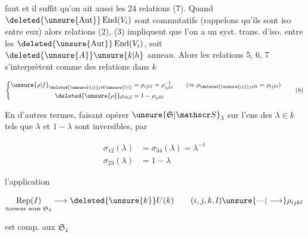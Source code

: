 
faut et il suffit qu'on ait aussi les 24 relations (7). Quand  $\deleted{\unsure{\operatorname{Aut}}}\operatorname{End}(V_i)$ sont commutatifs (rappelons qu'ils sont iso entre eux) alors    relations (2), (3) impliquent que l'on a un syst. trans. d'iso. entre les  $\deleted{\unsure{\operatorname{Aut}}}\operatorname{End}(V_i)$, soit $\deleted{\unsure{A}}\unsure{k|h}$  anneau. Alors les relations 5, 6, 7 s'interprètent comme des relations dans  $k$

\[
\left\{\begin{aligned}
\unsure{\rho|f}_{\deleted{\unsure{ij}}j i k\unsure{l|\ell}}&=\rho_{ijlk}=\rho_{ijkl}^{-1} \qquad (\Rightarrow \rho_{\deleted{\unsure{ij}}jilk}=\rho_{ijkl})\\
\deleted{\unsure{\rho}}\rho_{ikjl}&=1-\rho_{ijkl}
\end{aligned}\right. \tag*{(8)}
\]

En d'autres termes, faisant opérer $\unsure{\mathfrak S|\mathscr S}_3$ sur l'ens  des $\lambda\in k$ tels que $\lambda$ et $1-\lambda$ sont inversibles, par

\[
\begin{aligned}
\sigma_{12}(\lambda)&=\sigma_{34}(\lambda)=\lambda^{-1}\\
\sigma_{23}(\lambda)&=1-\lambda
\end{aligned}
\]


 l'application 

\[
\underset{\text{torseur sous }\mathfrak S_4}{\operatorname{Rep}(I)}\longrightarrow \deleted{\unsure{k}}U(k)
\qquad (i,j,k,l)\unsure{\text{---}|\longrightarrow}\rho_{ijkl}
\]

est comp. aux $\mathfrak S_4$
